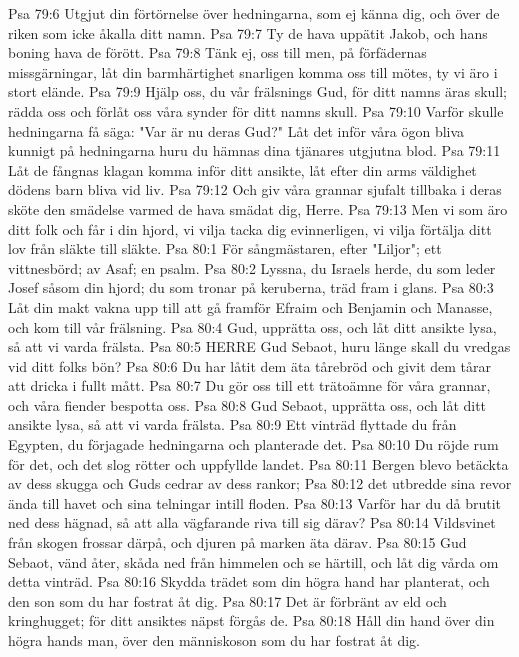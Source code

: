Psa 79:6  Utgjut din förtörnelse över hedningarna, som ej känna dig, och över de riken som icke åkalla ditt namn.
Psa 79:7  Ty de hava uppätit Jakob, och hans boning hava de förött.
Psa 79:8  Tänk ej, oss till men, på förfädernas missgärningar, låt din barmhärtighet snarligen komma oss till mötes, ty vi äro i stort elände.
Psa 79:9  Hjälp oss, du vår frälsnings Gud, för ditt namns äras skull; rädda oss och förlåt oss våra synder för ditt namns skull.
Psa 79:10  Varför skulle hedningarna få säga: "Var är nu deras Gud?" Låt det inför våra ögon bliva kunnigt på hedningarna huru du hämnas dina tjänares utgjutna blod.
Psa 79:11  Låt de fångnas klagan komma inför ditt ansikte, låt efter din arms väldighet dödens barn bliva vid liv.
Psa 79:12  Och giv våra grannar sjufalt tillbaka i deras sköte den smädelse varmed de hava smädat dig, Herre.
Psa 79:13  Men vi som äro ditt folk och får i din hjord, vi vilja tacka dig evinnerligen, vi vilja förtälja ditt lov från släkte till släkte.
Psa 80:1  För sångmästaren, efter "Liljor"; ett vittnesbörd; av Asaf; en psalm.
Psa 80:2  Lyssna, du Israels herde, du som leder Josef såsom din hjord; du som tronar på keruberna, träd fram i glans.
Psa 80:3  Låt din makt vakna upp till att gå framför Efraim och Benjamin och Manasse, och kom till vår frälsning.
Psa 80:4  Gud, upprätta oss, och låt ditt ansikte lysa, så att vi varda frälsta.
Psa 80:5  HERRE Gud Sebaot, huru länge skall du vredgas vid ditt folks bön?
Psa 80:6  Du har låtit dem äta tårebröd och givit dem tårar att dricka i fullt mått.
Psa 80:7  Du gör oss till ett trätoämne för våra grannar, och våra fiender bespotta oss.
Psa 80:8  Gud Sebaot, upprätta oss, och låt ditt ansikte lysa, så att vi varda frälsta.
Psa 80:9  Ett vinträd flyttade du från Egypten, du förjagade hedningarna och planterade det.
Psa 80:10  Du röjde rum för det, och det slog rötter och uppfyllde landet.
Psa 80:11  Bergen blevo betäckta av dess skugga och Guds cedrar av dess rankor;
Psa 80:12  det utbredde sina revor ända till havet och sina telningar intill floden.
Psa 80:13  Varför har du då brutit ned dess hägnad, så att alla vägfarande riva till sig därav?
Psa 80:14  Vildsvinet från skogen frossar därpå, och djuren på marken äta därav.
Psa 80:15  Gud Sebaot, vänd åter, skåda ned från himmelen och se härtill, och låt dig vårda om detta vinträd.
Psa 80:16  Skydda trädet som din högra hand har planterat, och den son som du har fostrat åt dig.
Psa 80:17  Det är förbränt av eld och kringhugget; för ditt ansiktes näpst förgås de.
Psa 80:18  Håll din hand över din högra hands man, över den människoson som du har fostrat åt dig.
